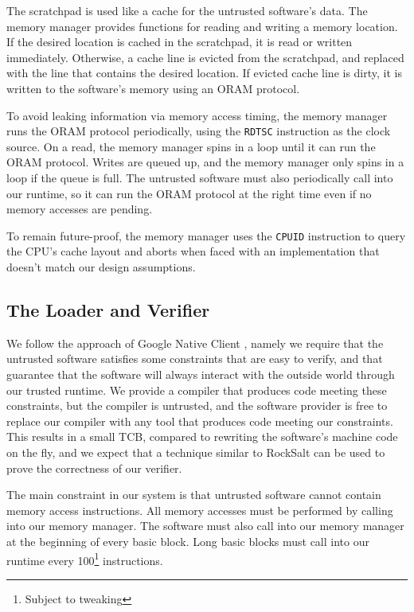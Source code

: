 The scratchpad is used like a cache for the untrusted software's data. The
memory manager provides functions for reading and writing a memory location.
If the desired location is cached in the scratchpad, it is read or written
immediately. Otherwise, a cache line is evicted from the scratchpad, and
replaced with the line that contains the desired location. If evicted cache
line is dirty, it is written to the software's memory using an ORAM protocol.

To avoid leaking information via memory access timing, the memory manager
runs the ORAM protocol periodically, using the \texttt{RDTSC} instruction as
the clock source. On a read, the memory manager spins in a loop until it can
run the ORAM protocol. Writes are queued up, and the memory manager only spins
in a loop if the queue is full. The untrusted software must also periodically
call into our runtime, so it can run the ORAM protocol at the right time
even if no memory accesses are pending.

To remain future-proof, the memory manager uses the \texttt{CPUID} instruction
\cite{intel2013manual} to query the CPU's cache layout and aborts when faced
with an implementation that doesn't match our design assumptions.


\subsection{The Loader and Verifier}

We follow the approach of Google Native Client \cite{yee2009native}
\cite{sehr2010adapting}, namely we require that the untrusted software
satisfies some constraints that are easy to verify, and that guarantee that the
software will always interact with the outside world through our trusted
runtime. We provide a compiler that produces code meeting these constraints,
but the compiler is untrusted, and the software provider is free to replace our
compiler with any tool that produces code meeting our constraints. This results
in a small TCB, compared to rewriting the software's machine code on the fly,
and we expect that a technique similar to RockSalt \cite{morrisett2012rocksalt}
can be used to prove the correctness of our verifier.

The main constraint in our system is that untrusted software cannot contain
memory access instructions. All memory accesses must be performed by calling
into our memory manager. The software must also call into our memory manager
at the beginning of every basic block. Long basic blocks must call into our
runtime every 100\footnote{Subject to tweaking} instructions.


